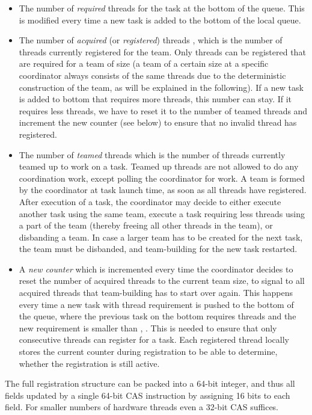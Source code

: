 \documentclass[preprint]{sigplanconf}
\begin{document}
\begin{itemize}
\item 
The number of \emph{required} threads  for the task at the bottom
of the queue. This is modified every time a new task is added to the
bottom of the local queue.
\item
The number of \emph{acquired} (or \emph{registered}) threads ,
which is the number of threads currently registered for the team. Only
threads can be registered that are required for a team of size  (a
team of a certain size at a specific coordinator always consists of
the same threads due to the deterministic construction of the team, as
will be explained in the following). If a new task is added to bottom
that requires more threads, this number can stay. If it requires less
threads, we have to reset it to the number of teamed threads and
increment the new counter  (see below) to ensure that no invalid
thread has registered.
\item 
The number of \emph{teamed} threads  which is the number of threads
currently teamed up to work on a task. Teamed up threads are not
allowed to do any coordination work, except polling the coordinator
for work. A team is formed by the coordinator at task launch time, as
soon as all threads have registered. After execution of a task, the
coordinator may decide to either execute another task using the same
team, execute a task requiring less threads using a part of the team
(thereby freeing all other threads in the team), or disbanding a
team. In case a larger team has to be created for the next task, the
team must be disbanded, and team-building for the new task restarted.
\item A \emph{new counter}  which is incremented every time the
coordinator decides to reset the number of acquired threads to the
current team size, to signal to all acquired threads that
team-building has to start over again. This happens every time a new
task with thread requirement  is pushed to the bottom of the
queue, where the previous task on the bottom requires  threads
and the new requirement  is smaller than , .  This is
needed to ensure that only consecutive threads can register for a
task. Each registered thread locally stores the current counter during
registration to be able to determine, whether the registration is
still active.
\end{itemize}

The full registration structure can be packed into a 64-bit integer,
and thus all fields updated by a single 64-bit CAS instruction by
assigning 16 bits to each field. For smaller numbers of hardware
threads even a 32-bit CAS suffices.
\end{document}
